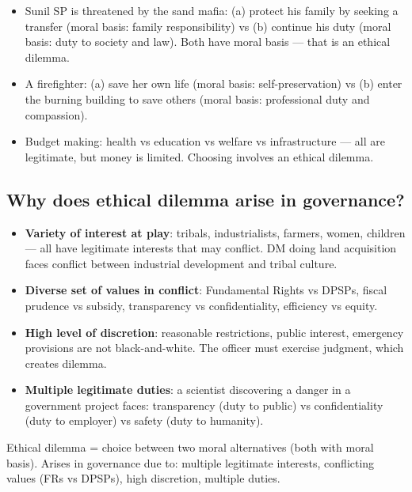 \begin{ExampleBox}
\begin{itemize}
\item Sunil SP is threatened by the sand mafia: (a) protect his family by seeking a transfer (moral basis: family responsibility) vs (b) continue his duty (moral basis: duty to society and law). Both have moral basis --- that is an ethical dilemma.
\item A firefighter: (a) save her own life (moral basis: self-preservation) vs (b) enter the burning building to save others (moral basis: professional duty and compassion).
\item Budget making: health vs education vs welfare vs infrastructure --- all are legitimate, but money is limited. Choosing involves an ethical dilemma.
\end{itemize}
\end{ExampleBox}

\subsection*{Why does ethical dilemma arise in governance?}
\begin{itemize}
\item \textbf{Variety of interest at play}: tribals, industrialists, farmers, women, children --- all have legitimate interests that may conflict. DM doing land acquisition faces conflict between industrial development and tribal culture.
\item \textbf{Diverse set of values in conflict}: Fundamental Rights vs DPSPs, fiscal prudence vs subsidy, transparency vs confidentiality, efficiency vs equity.
\item \textbf{High level of discretion}: reasonable restrictions, public interest, emergency provisions are not black-and-white. The officer must exercise judgment, which creates dilemma.
\item \textbf{Multiple legitimate duties}: a scientist discovering a danger in a government project faces: transparency (duty to public) vs confidentiality (duty to employer) vs safety (duty to humanity).
\end{itemize}

\begin{QuickRevision}
Ethical dilemma = choice between two moral alternatives (both with moral basis). Arises in governance due to: multiple legitimate interests, conflicting values (FRs vs DPSPs), high discretion, multiple duties.
\end{QuickRevision}

